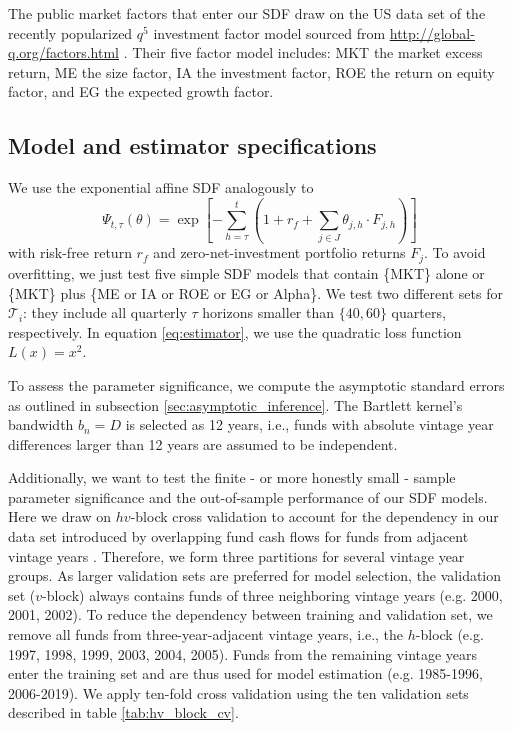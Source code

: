 \documentclass[12pt]{article}
\begin{document}
The public market factors that enter our SDF draw on the US data set of the recently popularized $q^5$ investment factor model sourced from \url{http://global-q.org/factors.html} \citep{HXZ15,HXZ20}. 
Their five factor model includes: MKT the market excess return, ME the size factor, IA the investment factor, ROE the return on equity factor, and EG the expected growth factor.


\subsection{Model and estimator specifications}
\label{sec:model_selection}

We use the exponential affine SDF analogously to \cite{KN16}
\begin{equation}
\label{eq:SDF}
\Psi_{t,\tau} (\theta) = 
\exp
\left[
-
\sum_{h=\tau}^{t} \left( 1 + r_f + \sum_{j \in J} \theta_{j,h} \cdot F_{j,h} \right)
\right]
\end{equation}
with risk-free return $r_f$ and zero-net-investment portfolio returns $F_j$.
To avoid overfitting, we just test five simple SDF models that contain \{MKT\} alone or \{MKT\} plus \{ME or IA or ROE or EG or Alpha\}.
We test two different sets for $\mathcal{T}_i$: they include all quarterly $\tau$ horizons smaller than $\{40, 60\}$ quarters, respectively.
In equation \ref{eq:estimator}, we use the quadratic loss function $L(x)=x^2$.

To assess the parameter significance, we compute the asymptotic standard errors as outlined in subsection \ref{sec:asymptotic_inference}.
The Bartlett kernel's bandwidth $b_n=D$ is selected as 12 years, i.e., funds with absolute vintage year differences larger than 12 years are assumed to be independent.

Additionally, we want to test the finite - or more honestly small - sample parameter significance and the out-of-sample performance of our SDF models.
Here we draw on $hv$-block cross validation to account for the dependency in our data set introduced by overlapping fund cash flows for funds from adjacent vintage years \citep{R00}. 
Therefore, we form three partitions for several vintage year groups. 
As larger validation sets are preferred for model selection, the validation set ($v$-block) always contains funds of three neighboring vintage years (e.g. 2000, 2001, 2002). 
To reduce the dependency between training and validation set, we remove all funds from three-year-adjacent vintage years, i.e., the $h$-block (e.g. 1997, 1998, 1999, 2003, 2004, 2005). 
Funds from the remaining vintage years enter the training set and are thus used for model estimation (e.g. 1985-1996, 2006-2019).
We apply ten-fold cross validation using the ten validation sets described in table \ref{tab:hv_block_cv}.
\end{document}
